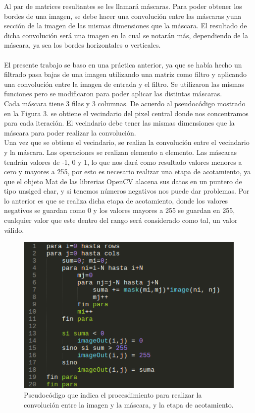 \documentclass[conference]{IEEEtran}
\begin{document}
Al par de matrices resultantes se les llamar\'a m\'ascaras. Para poder obtener los bordes de una imagen, se debe hacer una convoluci\'on entre las m\'ascaras yuna secci\'on de la imagen de las mismas dimensiones que la m\'ascara. El resultado de dicha convoluci\'on ser\'a una imagen en la cual se notar\'an m\'as, dependiendo de la m\'ascara, ya sea los bordes horizontales o verticales.\\\\
El presente trabajo se baso en una pr\'actica anterior, ya que se hab\'ia hecho un filtrado pasa bajas de una imagen utilizando una matriz como filtro y aplicando una convoluci\'on entre la imagen de entrada y el filtro. Se utilizaron las mismas funciones pero se modificaron para poder aplicar las distintas m\'ascaras.\\
Cada m\'ascara tiene 3 filas y 3 columnas. De acuerdo al pseudoc\'odigo mostrado en la Figura 3. se obtiene el vecindario del pixel central donde nos concentramos para cada iteraci\'on. El vecindario debe tener las mismas dimensiones que la m\'ascara para poder realizar la convoluci\'on.\\
Una vez que se obtiene el vecindario, se realiza la convoluci\'on entre el vecindario y la m\'ascara. Las operaciones se realizan elemento a elemento. Las m\'ascaras tendr\'an valores de -1, 0 y 1, lo que nos dar\'a como resultado valores menores a cero y mayores a 255, por esto es necesario realizar una etapa de acotamiento, ya que el objeto Mat de las librerias OpenCV alacena sus datos en un puntero de tipo unsiged char, y si tenemos n\'umeros negativos nos puede dar problemas. Por lo anterior es que se realiza dicha etapa de acotamiento, donde los valores negativos se guardan como 0 y los valores mayores a 255 se guardan en 255, cualquier valor que este dentro del rango ser\'a considerado como tal, un valor v\'alido.

\begin{figure}[h]
	\centering
	\setlength{\unitlength}{0.00105in}
	\includegraphics[scale=0.50]{./images/algoritmo.png}
	\caption{Pseudoc\'odigo que indica el procesdimiento para realizar la convoluci\'on entre la imagen y la m\'ascara, y la etapa de acotamiento.}
\end{figure}
\end{document}
